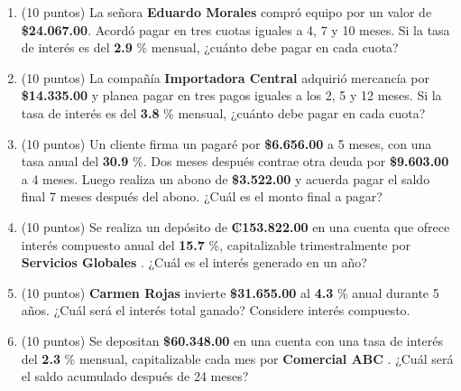 \documentclass[10pt]{article}
\begin{document}
\begin{enumerate}[leftmargin=*, label=\textbf{\arabic*.}]
  \item (10 puntos) La señora \textbf{ Eduardo Morales } compró equipo por un valor de \textbf{\$\num{ 24,067.00 }}. Acordó pagar en tres cuotas iguales a 4, 7 y 10 meses. Si la tasa de interés es del \textbf{ 2.9 }\% mensual, ¿cuánto debe pagar en cada cuota?

  \vspace{0.5cm}

  \item (10 puntos) La compañía \textbf{ Importadora Central } adquirió mercancía por \textbf{\$\num{ 14,335.00 }} y planea pagar en tres pagos iguales a los 2, 5 y 12 meses. Si la tasa de interés es del \textbf{ 3.8 }\% mensual, ¿cuánto debe pagar en cada cuota?

  \vspace{0.5cm}

  \item (10 puntos) Un cliente firma un pagaré por \textbf{\$\num{ 6,656.00 }} a 5 meses, con una tasa anual del \textbf{ 30.9 }\%. Dos meses después contrae otra deuda por \textbf{\$\num{ 9,603.00 }} a 4 meses. Luego realiza un abono de \textbf{\$\num{ 3,522.00 }} y acuerda pagar el saldo final 7 meses después del abono. ¿Cuál es el monto final a pagar?

  \vspace{0.5cm}

  \item (10 puntos) Se realiza un depósito de \textbf{₡\num{ 153.822.00 }} en una cuenta que ofrece interés compuesto anual del \textbf{ 15.7 }\%, capitalizable trimestralmente por \textbf{ Servicios Globales }. ¿Cuál es el interés generado en un año?

  \vspace{0.5cm}

  \item (10 puntos) \textbf{ Carmen Rojas } invierte \textbf{\$\num{ 31,655.00 }} al \textbf{ 4.3 }\% anual durante 5 años. ¿Cuál será el interés total ganado? Considere interés compuesto.

  \vspace{0.5cm}

  \item (10 puntos) Se depositan \textbf{\$\num{ 60,348.00 }} en una cuenta con una tasa de interés del \textbf{ 2.3 }\% mensual, capitalizable cada mes por \textbf{ Comercial ABC }. ¿Cuál será el saldo acumulado después de 24 meses?
\end{enumerate}
\end{document}

